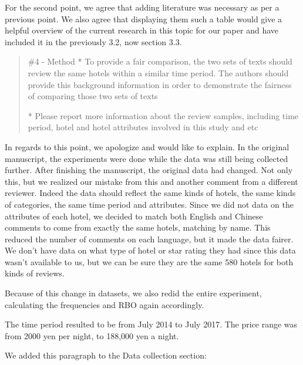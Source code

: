 \documentclass{letter}
\begin{document}
For the second point, we agree that adding literature was necessary as per a previous point. We also agree that displaying them such a table would give a helpful overview of the current research in this topic for our paper and have included it in the previously 3.2, now section 3.3.



\begin{quotation}
\#4 - Method
*  To provide a fair comparison, the two sets of texts should review the same hotels within a similar time period. The authors should provide this background information in order to demonstrate the fairness of comparing those two sets of texts

*  Please report more information about the review samples, including time period, hotel and hotel attributes involved in this study and etc
\end{quotation}


In regards to this point, we apologize and would like to explain. In the original manuscript, the experiments were done while the data was still being collected further. After finishing the manuscript, the original data had changed. Not only this, but we realized our mistake from this and another comment from a different reviewer. Indeed the data should reflect the same kinds of hotels, the same kinds of categories, the same time period and attributes. Since we did not data on the attributes of each hotel, we decided to match both English and Chinese comments to come from exactly the same hotels, matching by name. This reduced the number of comments on each language, but it made the data fairer. We don't have data on what type of hotel or star rating they had since this data wasn't available to us, but we can be sure they are the same 580 hotels for both kinds of reviews. 

Because of this change in datasets, we also redid the entire experiment, calculating the frequencies and RBO again accordingly. 

The time period resulted to be from July 2014 to July 2017. The price range was from 2000 yen per night, to 188,000 yen a night.

We added this paragraph to the Data collection section:
\end{document}

